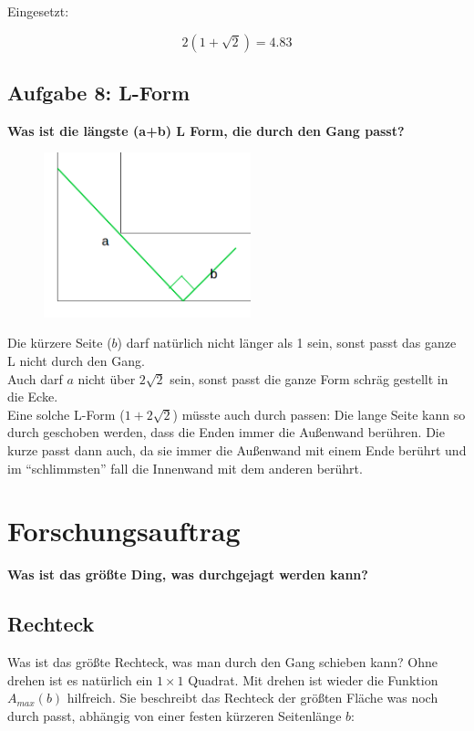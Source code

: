 \documentclass[a4paper,11pt]{article}
\begin{document}
Eingesetzt:

\[ 2(1+\sqrt{2})=4.83 \]

\subsection{Aufgabe 8: L-Form}
\textbf{Was ist die l\"angste (a+b) L Form, die durch den Gang passt?} \\

\begin{figure}[htbp] 
        \centering
        \includegraphics[width=6cm]{img/A8_1.png}
\end{figure}

Die kürzere Seite ($b$) darf natürlich nicht länger als 1 sein, sonst passt das ganze L nicht durch den Gang. \\
Auch darf $a$ nicht \"uber $2\sqrt{2}$ sein, sonst passt die ganze Form schräg gestellt in die Ecke. \\
Eine solche L-Form ($1+2\sqrt{2}$) müsste auch durch passen: Die lange Seite kann so durch geschoben werden, dass die Enden immer die Außenwand berühren. Die kurze passt dann auch, da sie immer die Außenwand mit einem Ende berührt und im ``schlimmsten'' fall die Innenwand mit dem anderen berührt.

\section{Forschungsauftrag}
\textbf{Was ist das größte Ding, was durchgejagt werden kann?}

\subsection{Rechteck}
Was ist das größte Rechteck, was man durch den Gang schieben kann? Ohne drehen ist es natürlich ein $1\times 1$ Quadrat. Mit drehen ist wieder die Funktion $A_{max}(b)$ hilfreich. Sie beschreibt das Rechteck der größten Fläche was noch durch passt, abhängig von einer festen kürzeren Seitenlänge $b$:
\end{document}

